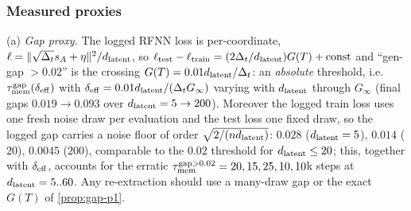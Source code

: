 \subsubsection{Measured proxies}

\begin{remark}\label{rem:proxy-p1}
(a) \emph{Gap proxy.} The logged RFNN loss is per-coordinate, $\ell=\|\sqrt{\Delta_t}s_A+\eta\|^2/d_{\mathrm{latent}}$, so $\ell_{\rm test}-\ell_{\rm train}=(2\Delta_t/d_{\mathrm{latent}})G(T)+{\rm const}$ and ``gen-gap $>0.02$'' is the crossing $G(T)=0.01d_{\mathrm{latent}}/\Delta_t$: an \emph{absolute} threshold, i.e.\ $\tau_{\mathrm{mem}}^{\rm gap}(\delta_{\rm eff})$ with $\delta_{\rm eff}=0.01d_{\mathrm{latent}}/(\Delta_tG_\infty)$ varying with $d_{\mathrm{latent}}$ through $G_\infty$ (final gaps $0.019\to0.093$ over $d_{\mathrm{latent}}=5\to200$). Moreover the logged train loss uses one fresh noise draw per evaluation and the test loss one fixed draw, so the logged gap carries a noise floor of order $\sqrt{2/(nd_{\mathrm{latent}})}$: $0.028$ ($d_{\mathrm{latent}}=5$), $0.014$ ($20$), $0.0045$ ($200$), comparable to the $0.02$ threshold for $d_{\mathrm{latent}}\le20$; this, together with $\delta_{\rm eff}$, accounts for the erratic $\tau_{\mathrm{mem}}^{\rm gap>0.02}=20,15,25,10,10$k steps at $d_{\mathrm{latent}}=5..60$. Any re-extraction should use a many-draw gap or the exact $G(T)$ of \cref{prop:gap-p1}.

\end{remark}
